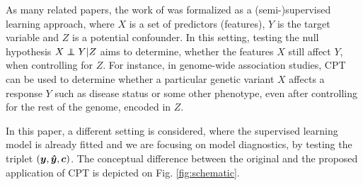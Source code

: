 \documentclass{article}
\begin{document}
As many related papers, the work of\cite{berrett2020conditional} was formalized as a (semi-)supervised learning approach, where $X$ is a set of predictors (features), $Y$ is the target variable and $Z$ is a potential confounder. In this setting, testing the null hypothesis $X \independent Y | Z$ aims to determine, whether the features $X$ still affect $Y$, when controlling for $Z$.
For instance, in genome-wide association studies, CPT can be used to determine whether a particular genetic variant $X$ affects a response $Y$ such as disease status or some other phenotype, even after controlling for the rest of the genome, encoded in $Z$.

In this paper, a different setting is considered, where the supervised learning model is already fitted and we are focusing on model diagnostics, by testing the triplet $(\boldsymbol{y},\boldsymbol{\hat{y}}, \boldsymbol{c})$. 
The conceptual difference between the original and the proposed application of CPT is depicted on Fig. \ref{fig:schematic}.
\end{document}
